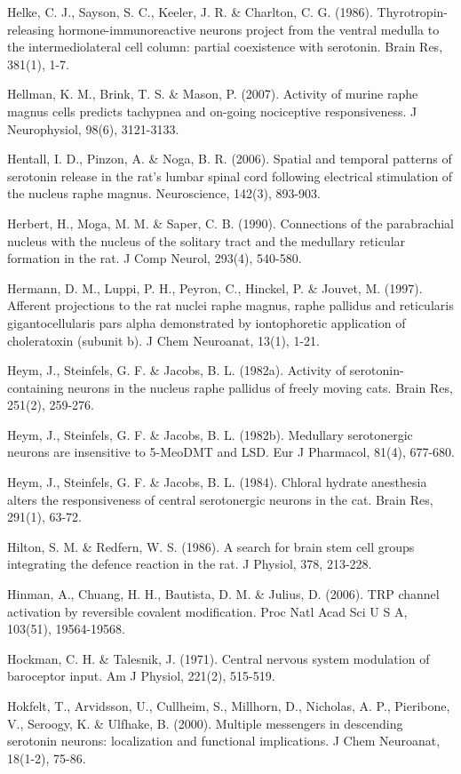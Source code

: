 \documentclass[a4paper,12pt,twoside]{report}
\begin{document}
\begin{singlespacing}
\begin{footnotesize}
Helke, C. J., Sayson, S. C., Keeler, J. R. \& Charlton, C. G. (1986). Thyrotropin-releasing hormone-immunoreactive neurons project from the ventral medulla to the intermediolateral cell column: partial coexistence with serotonin. Brain Res, 381(1), 1-7.

Hellman, K. M., Brink, T. S. \& Mason, P. (2007). Activity of murine raphe magnus cells predicts tachypnea and on-going nociceptive responsiveness. J Neurophysiol, 98(6), 3121-3133.

Hentall, I. D., Pinzon, A. \& Noga, B. R. (2006). Spatial and temporal patterns of serotonin release in the rat's lumbar spinal cord following electrical stimulation of the nucleus raphe magnus. Neuroscience, 142(3), 893-903.

Herbert, H., Moga, M. M. \& Saper, C. B. (1990). Connections of the parabrachial nucleus with the nucleus of the solitary tract and the medullary reticular formation in the rat. J Comp Neurol, 293(4), 540-580.

Hermann, D. M., Luppi, P. H., Peyron, C., Hinckel, P. \& Jouvet, M. (1997). Afferent projections to the rat nuclei raphe magnus, raphe pallidus and reticularis gigantocellularis pars alpha demonstrated by iontophoretic application of choleratoxin (subunit b). J Chem Neuroanat, 13(1), 1-21.

Heym, J., Steinfels, G. F. \& Jacobs, B. L. (1982a). Activity of serotonin-containing neurons in the nucleus raphe pallidus of freely moving cats. Brain Res, 251(2), 259-276.

Heym, J., Steinfels, G. F. \& Jacobs, B. L. (1982b). Medullary serotonergic neurons are insensitive to 5-MeoDMT and LSD. Eur J Pharmacol, 81(4), 677-680.

Heym, J., Steinfels, G. F. \& Jacobs, B. L. (1984). Chloral hydrate anesthesia alters the responsiveness of central serotonergic neurons in the cat. Brain Res, 291(1), 63-72.

Hilton, S. M. \& Redfern, W. S. (1986). A search for brain stem cell groups integrating the defence reaction in the rat. J Physiol, 378, 213-228.

Hinman, A., Chuang, H. H., Bautista, D. M. \& Julius, D. (2006). TRP channel activation by reversible covalent modification. Proc Natl Acad Sci U S A, 103(51), 19564-19568.

Hockman, C. H. \& Talesnik, J. (1971). Central nervous system modulation of baroceptor input. Am J Physiol, 221(2), 515-519.

Hokfelt, T., Arvidsson, U., Cullheim, S., Millhorn, D., Nicholas, A. P., Pieribone, V., Seroogy, K. \& Ulfhake, B. (2000). Multiple messengers in descending serotonin neurons: localization and functional implications. J Chem Neuroanat, 18(1-2), 75-86.


\end{footnotesize}
\end{singlespacing}
\end{document}
